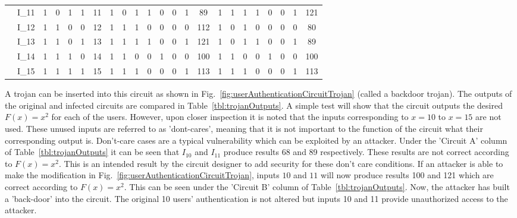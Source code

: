 \begin{table}[]
\begin{tabular}{CC|C|C|C|C|C||C|C|C|C|C|C|C|C||C|C|C|C|C|C|C|C|}
		 & I_{11} & 1 & 0 & 1 & 1 & 11 & 1 & 0 & 1 & 1 & 0 & 0 & 1 & 89 & 1 & 1 & 1 & 1 & 0 & 0 & 1 & 121 \\ 
		 & I_{12} & 1 & 1 & 0 & 0 & 12 & 1 & 1 & 1 & 0 & 0 & 0 & 0 & 112 & 1 & 0 & 1 & 0 & 0 & 0 & 0 & 80 \\ 
		 & I_{13} & 1 & 1 & 0 & 1 & 13 & 1 & 1 & 1 & 1 & 0 & 0 & 1 & 121 & 1 & 0 & 1 & 1 & 0 & 0 & 1 & 89 \\ 
		 & I_{14} & 1 & 1 & 1 & 0 & 14 & 1 & 1 & 0 & 0 & 1 & 0 & 0 & 100 & 1 & 1 & 0 & 0 & 1 & 0 & 0 & 100 \\ 
		 & I_{15} & 1 & 1 & 1 & 1 & 15 & 1 & 1 & 1 & 0 & 0 & 0 & 1 & 113 & 1 & 1 & 1 & 0 & 0 & 0 & 1 & 113 \\ \hline
	\end{tabular}
\end{table}
A trojan can be inserted into this circuit as shown in Fig.~\ref{fig:userAuthenticationCircuitTrojan} (called a backdoor trojan).
The outputs of the original and infected circuits are compared in Table~\ref{tbl:trojanOutputs}.
A simple test will show that the circuit outputs the desired $F(x) = x^2$ for each of the users.
However, upon closer inspection it is noted that the inputs corresponding to $x = 10$ to $x = 15$ are not used.
These unused inputs are referred to as 'dont-cares', meaning that it is not important to the function of the circuit what their corresponding output is.
Don't-care cases are a typical vulnerability which can be exploited by an attacker.
Under the 'Circuit A' column of Table~\ref{tbl:trojanOutputs} it can be seen that $I_{10}$ and $I_{11}$ produce results 68 and 89 respectively.
These results are not correct according to $F(x) = x^2$.
This is an intended result by the circuit designer to add security for these don't care conditions.
If an attacker is able to make the modification in Fig.~\ref{fig:userAuthenticationCircuitTrojan}, inputs $10$ and $11$ will now produce results 100 and 121 which are correct according to $F(x) = x^2$.
This can be seen under the 'Circuit B' column of Table~\ref{tbl:trojanOutputs}.
Now, the attacker has built a 'back-door' into the circuit.
The original 10 users' authentication is not altered but inputs 10 and 11 provide unauthorized access to the attacker.

